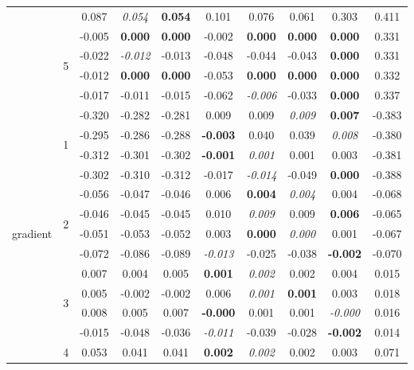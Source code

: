 \documentclass[authoryear, review, 11pt]{elsarticle}
\begin{document}
\begin{table}
\begin{center}
{\begin{tabular}{cccccccccc}
   &  & 0.087 & \emph{0.054} & \textbf{0.054} & 0.101 & 0.076 & 0.061 & 0.303 & 0.411 \\ 
  \cline{3-10}
   & \multirow{4}{*}{5} & -0.005 & \textbf{0.000} & \textbf{0.000} & -0.002 & \textbf{0.000} & \textbf{0.000} & \textbf{0.000} & 0.331 \\ 
   &  & -0.022 & \emph{-0.012} & -0.013 & -0.048 & -0.044 & -0.043 & \textbf{0.000} & 0.331 \\ 
   &  & -0.012 & \textbf{0.000} & \textbf{0.000} & -0.053 & \textbf{0.000} & \textbf{0.000} & \textbf{0.000} & 0.332 \\ 
   &  & -0.017 & -0.011 & -0.015 & -0.062 & \emph{-0.006} & -0.033 & \textbf{0.000} & 0.337 \\ 
  \hline
  \multirow{20}{*}{gradient} & \multirow{4}{*}{1} & -0.320 & -0.282 & -0.281 & 0.009 & 0.009 & \emph{0.009} & \textbf{0.007} & -0.383 \\ 
   &  & -0.295 & -0.286 & -0.288 & \textbf{-0.003} & 0.040 & 0.039 & \emph{0.008} & -0.380 \\ 
   &  & -0.312 & -0.301 & -0.302 & \textbf{-0.001} & \emph{0.001} & 0.001 & 0.003 & -0.381 \\ 
   &  & -0.302 & -0.310 & -0.312 & -0.017 & \emph{-0.014} & -0.049 & \textbf{0.000} & -0.388 \\ 
  \cline{3-10}
   & \multirow{4}{*}{2} & -0.056 & -0.047 & -0.046 & 0.006 & \textbf{0.004} & \emph{0.004} & 0.004 & -0.068 \\ 
   &  & -0.046 & -0.045 & -0.045 & 0.010 & \emph{0.009} & 0.009 & \textbf{0.006} & -0.065 \\ 
   &  & -0.051 & -0.053 & -0.052 & 0.003 & \textbf{0.000} & \emph{0.000} & 0.001 & -0.067 \\ 
   &  & -0.072 & -0.086 & -0.089 & \emph{-0.013} & -0.025 & -0.038 & \textbf{-0.002} & -0.070 \\ 
  \cline{3-10}
   & \multirow{4}{*}{3} & 0.007 & 0.004 & 0.005 & \textbf{0.001} & \emph{0.002} & 0.002 & 0.004 & 0.015 \\ 
   &  & 0.005 & -0.002 & -0.002 & 0.006 & \emph{0.001} & \textbf{0.001} & 0.003 & 0.018 \\ 
   &  & 0.008 & 0.005 & 0.007 & \textbf{-0.000} & 0.001 & 0.001 & \emph{-0.000} & 0.016 \\ 
   &  & -0.015 & -0.048 & -0.036 & \emph{-0.011} & -0.039 & -0.028 & \textbf{-0.002} & 0.014 \\ 
  \cline{3-10}
   & \multirow{4}{*}{4} & 0.053 & 0.041 & 0.041 & \textbf{0.002} & \emph{0.002} & 0.002 & 0.003 & 0.071 \\ 

\end{tabular}}
\end{center}
\end{table}
\end{document}

